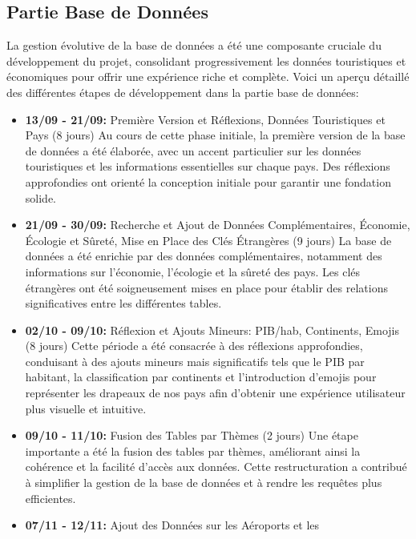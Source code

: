 \documentclass[mstat,12pt]{unswthesis}
\begin{document}
\begin{adjustwidth}{-2cm}{}
\hypertarget{partie-base-de-donnuxe9es}{%
\section{Partie Base de Données}\label{partie-base-de-donnuxe9es}}

\medskip

La gestion évolutive de la base de données a été une composante cruciale
du développement du projet, consolidant progressivement les données
touristiques et économiques pour offrir une expérience riche et
complète. Voici un aperçu détaillé des différentes étapes de
développement dans la partie base de données:

\begin{itemize}
\tightlist
\item
  \textbf{13/09 - 21/09:} Première Version et Réflexions, Données
  Touristiques et Pays (8 jours) Au cours de cette phase initiale, la
  première version de la base de données a été élaborée, avec un accent
  particulier sur les données touristiques et les informations
  essentielles sur chaque pays. Des réflexions approfondies ont orienté
  la conception initiale pour garantir une fondation solide.
\item
  \textbf{21/09 - 30/09:} Recherche et Ajout de Données Complémentaires,
  Économie, Écologie et Sûreté, Mise en Place des Clés Étrangères (9
  jours) La base de données a été enrichie par des données
  complémentaires, notamment des informations sur l'économie, l'écologie
  et la sûreté des pays. Les clés étrangères ont été soigneusement mises
  en place pour établir des relations significatives entre les
  différentes tables.
\item
  \textbf{02/10 - 09/10:} Réflexion et Ajouts Mineurs: PIB/hab,
  Continents, Emojis (8 jours) Cette période a été consacrée à des
  réflexions approfondies, conduisant à des ajouts mineurs mais
  significatifs tels que le PIB par habitant, la classification par
  continents et l'introduction d'emojis pour représenter les drapeaux de
  nos pays afin d'obtenir une expérience utilisateur plus visuelle et
  intuitive.
\item
  \textbf{09/10 - 11/10:} Fusion des Tables par Thèmes (2 jours) Une
  étape importante a été la fusion des tables par thèmes, améliorant
  ainsi la cohérence et la facilité d'accès aux données. Cette
  restructuration a contribué à simplifier la gestion de la base de
  données et à rendre les requêtes plus efficientes.
\item
  \textbf{07/11 - 12/11:} Ajout des Données sur les Aéroports et les

\end{itemize}
\end{adjustwidth}
\end{document}
